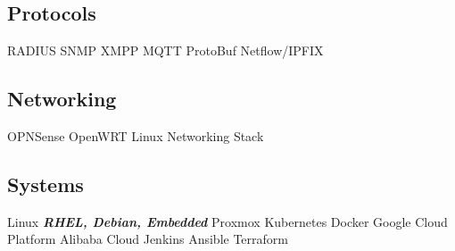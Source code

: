 \documentclass[letterpaper]{deedy-resume} %
\begin{document}
\begin{minipage}[t]{0.33\textwidth}
\sectionspace

\subsection{Protocols}
RADIUS \textbullet{} SNMP \textbullet{} XMPP
\textbullet{} MQTT \textbullet{} ProtoBuf \textbullet{} Netflow/IPFIX

\sectionspace

\subsection{Networking}
OPNSense \textbullet{} OpenWRT \textbullet{}
Linux Networking Stack

\sectionspace

\subsection{Systems}
Linux {\footnotesize \textit{\textbf{RHEL, Debian, Embedded}}} \textbullet{} Proxmox
\textbullet{} Kubernetes \textbullet{} Docker
\textbullet{} Google Cloud Platform \textbullet{} Alibaba Cloud
\textbullet{} Jenkins \textbullet{} Ansible \textbullet{} Terraform

\sectionspace %


\end{minipage} %
\hfill
%
%
\end{document}
